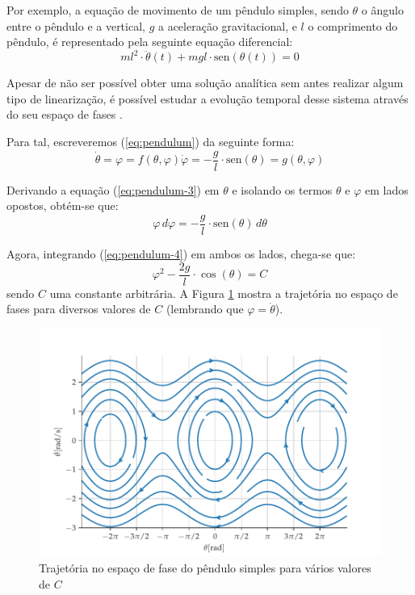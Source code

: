 \documentclass[a4paper, 12pt]{article}
\newcommand{\sen}{\text{sen}}
\begin{document}
Por exemplo, a equação de movimento de um pêndulo simples, sendo $\theta$ o ângulo entre o pêndulo e a vertical, $g$ a aceleração gravitacional, e $l$ o comprimento do pêndulo, é representado pela seguinte equação diferencial:
\begin{equation}\label{eq:pendulum}
m l^2 \cdot \ddot{\theta}(t) + mgl\cdot  \sen(\theta(t)) = 0
\end{equation}

Apesar de não ser possível obter uma solução analítica sem antes realizar algum tipo de linearização, é possível estudar a evolução temporal desse sistema através do seu espaço de fases \cite{fiedler1994caos}.

Para tal, escreveremos (\ref{eq:pendulum}) da seguinte forma:
\begin{subequations}
\begin{equation}\label{eq:pendulum-2}
\dot{\theta} = \varphi = f(\theta, \varphi)
\end{equation}
\begin{equation}\label{eq:pendulum-3}
\dot{\varphi} = -\frac{g}{l} \cdot \sen(\theta) = g(\theta, \varphi)
\end{equation}
\end{subequations}

Derivando a equação (\ref{eq:pendulum-3}) em $\theta$ e isolando os termos $\theta$ e $\varphi$ em lados opostos, obtém-se que:
\begin{equation}\label{eq:pendulum-4}
\varphi \, d\varphi = -\frac{g}{l} \cdot \sen(\theta) \, d\theta
\end{equation}

Agora, integrando (\ref{eq:pendulum-4}) em ambos os lados, chega-se que:
\begin{equation}
\varphi^2 - \frac{2g}{l} \cdot \cos(\theta) = C
\end{equation}
sendo $C$ uma constante arbitrária. A Figura \ref{fig:pendulum-phase-space} mostra a trajetória no espaço de fases para diversos valores de $C$ (lembrando que $\varphi = \dot{\theta}$).
\begin{figure}[!ht]
\centering
\includegraphics[scale = 0.7]{pendulum-phase-space.pdf}
\caption{Trajetória no espaço de fase do pêndulo simples para vários valores de $C$}
\label{fig:pendulum-phase-space}
\end{figure}
\end{document}
